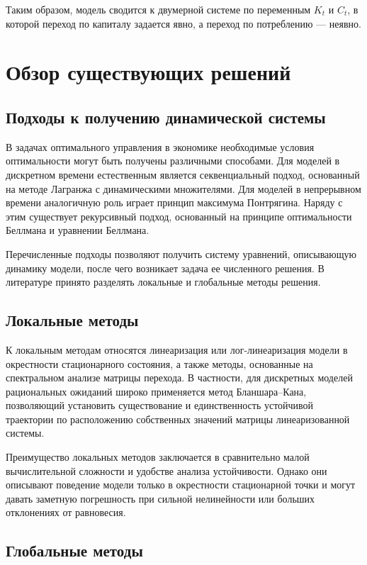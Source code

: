 \documentclass[14pt,a4paper]{extreport}
\begin{document}
    Таким образом, модель сводится к двумерной системе по переменным $K_t$ и $C_t$, в которой переход по капиталу задается явно, а переход по потреблению --- неявно.

\chapter{Обзор существующих решений}

    \section{Подходы к получению динамической системы}

    В задачах оптимального управления в экономике необходимые условия оптимальности могут быть получены различными способами. Для моделей в дискретном времени естественным является секвенциальный подход, основанный на методе Лагранжа с динамическими множителями. Для моделей в непрерывном времени аналогичную роль играет принцип максимума Понтрягина. Наряду с этим существует рекурсивный подход, основанный на принципе оптимальности Беллмана и уравнении Беллмана.

    Перечисленные подходы позволяют получить систему уравнений, описывающую динамику модели, после чего возникает задача ее численного решения. В литературе принято разделять локальные и глобальные методы решения.

    \section{Локальные методы}

    К локальным методам относятся линеаризация или лог-линеаризация модели в окрестности стационарного состояния, а также методы, основанные на спектральном анализе матрицы перехода. В частности, для дискретных моделей рациональных ожиданий широко применяется метод Бланшара--Кана, позволяющий установить существование и единственность устойчивой траектории по расположению собственных значений матрицы линеаризованной системы.

    Преимущество локальных методов заключается в сравнительно малой вычислительной сложности и удобстве анализа устойчивости. Однако они описывают поведение модели только в окрестности стационарной точки и могут давать заметную погрешность при сильной нелинейности или больших отклонениях от равновесия.

    \section{Глобальные методы}
\end{document}

